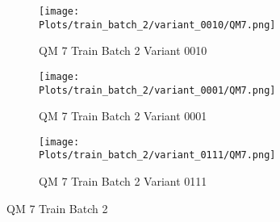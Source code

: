 \documentclass{DissertateFigs}
\begin{document}
\begin{figure}[t!]
\medskip

    \begin{subfigure}{0.47\textwidth}
    \texttt{[image: Plots/train\_batch\_2/variant\_0010/QM7.png]}
    \caption{QM 7 Train Batch 2 Variant 0010}
    \end{subfigure}
    \begin{subfigure}{0.47\textwidth}
    \texttt{[image: Plots/train\_batch\_2/variant\_0001/QM7.png]}
    \caption{QM 7 Train Batch 2 Variant 0001}
    \end{subfigure}

\medskip

    \begin{subfigure}{0.47\textwidth}
    \texttt{[image: Plots/train\_batch\_2/variant\_0111/QM7.png]}
    \caption{QM 7 Train Batch 2 Variant 0111}
    \end{subfigure}
\caption{QM 7 Train Batch 2}
    \end{figure}
\clearpage
\end{document}
